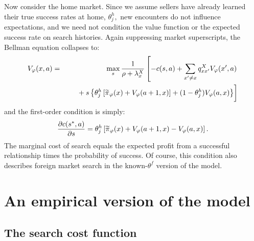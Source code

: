 \documentclass[12pt]{article}
\begin{document}
Now consider the home market. Since we assume sellers have already learned
their true success rates at home, $\theta _{j}^{h},$ new encounters do not
influence expectations, and we need not condition the value function or the
expected success rate on search histories$.$ Again suppressing market
superscripts, the Bellman equation collapses to:%
\begin{eqnarray}
V_{\varphi }(x,a) &=&\max_{s}\frac{1}{\rho +\lambda _{x}^{X}}\left[
-c(s,a)+\sum_{x^{\prime }\neq x}q_{xx^{\prime }}^{X}V_{\varphi }(x^{\prime
},a)\right.  \notag \\
&&\left. 
\begin{array}{c}
\; \\ 
\;%
\end{array}%
+s\left\{ \theta _{j}^{h}\left[ \widetilde{\pi }_{\varphi }(x)+V_{\varphi
}(a+1,x)\right] +(1-\theta _{j}^{h})V_{\varphi }(a,x)\right\} \right]
\end{eqnarray}%
and the first-order condition is simply:%
\begin{equation*}
\frac{\partial c(s^{\ast },a)}{\partial s}=\theta _{j}^{h}\left[ \widetilde{%
\pi }_{\varphi }(x)+V_{\varphi }(a+1,x)-V_{\varphi }(a,x)\right] .
\end{equation*}%
The marginal cost of search equals the expected profit from a successful
relationship times the probability of success. Of course, this condition
also describes foreign market search in the known-$\theta ^{f}$ version of
the model.

\section{An empirical version of the model}

\subsection{The search cost function}
\end{document}
